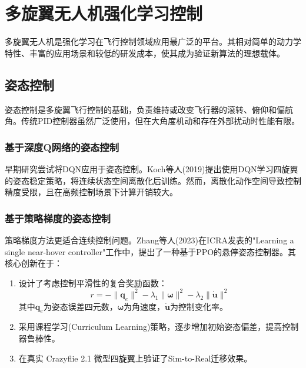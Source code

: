 \documentclass[12pt,a4paper]{ctexart}
\begin{document}
\section{多旋翼无人机强化学习控制}\label{sec:multirotor}

多旋翼无人机是强化学习在飞行控制领域应用最广泛的平台。其相对简单的动力学特性、丰富的应用场景和较低的研发成本，使其成为验证新算法的理想载体。

\subsection{姿态控制}

姿态控制是多旋翼飞行控制的基础，负责维持或改变飞行器的滚转、俯仰和偏航角。传统PID控制器虽然广泛使用，但在大角度机动和存在外部扰动时性能有限。

\subsubsection{基于深度Q网络的姿态控制}

早期研究尝试将DQN应用于姿态控制。Koch等人(2019)提出使用DQN学习四旋翼的姿态稳定策略，将连续状态空间离散化后训练。然而，离散化动作空间导致控制精度受限，且在高频控制场景下计算开销较大。

\subsubsection{基于策略梯度的姿态控制}

策略梯度方法更适合连续控制问题。Zhang等人(2023)在ICRA发表的"Learning a single near-hover controller"工作中，提出了一种基于PPO的悬停姿态控制器。其核心创新在于：

\begin{enumerate}
    \item 设计了考虑控制平滑性的复合奖励函数：
    \begin{equation}
        r = -\|\mathbf{q}_e\|^2 - \lambda_1 \|\boldsymbol{\omega}\|^2 - \lambda_2 \|\dot{\mathbf{u}}\|^2
    \end{equation}
    其中$\mathbf{q}_e$为姿态误差四元数，$\boldsymbol{\omega}$为角速度，$\dot{\mathbf{u}}$为控制变化率。
    
    \item 采用课程学习(Curriculum Learning)策略，逐步增加初始姿态偏差，提高控制器鲁棒性。
    
    \item 在真实 Crazyflie 2.1 微型四旋翼上验证了Sim-to-Real迁移效果。
\end{enumerate}
\end{document}
